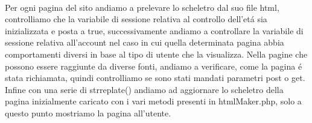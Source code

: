 \paragraph{}
Per ogni pagina del sito andiamo a prelevare lo scheletro dal suo file html, controlliamo che la variabile di sessione relativa al controllo dell'etá sia inizializzata e posta a true, successivamente andiamo a controllare la variabile di sessione relativa all'account nel caso in cui quella determinata pagina abbia comportamenti diversi in base al tipo di utente che la visualizza. Nella pagine che possono essere raggiunte da diverse fonti, andiamo a verificare, come la pagina é stata richiamata, quindi controlliamo se sono stati mandati parametri post o get. Infine con una serie di str\textunderscore replate() andiamo ad aggiornare lo scheletro della pagina inizialmente caricato con i vari metodi presenti in htmlMaker.php, solo a questo punto mostriamo la pagina all'utente.